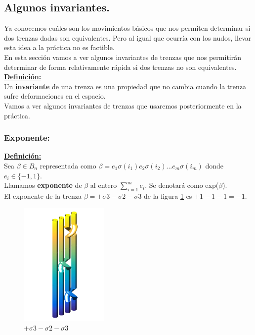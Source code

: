 \documentclass[14pt]{extarticle}
\begin{document}
\subsection{Algunos invariantes.}
Ya conocemos cuáles son los movimientos básicos que nos permiten determinar si dos trenzas dadas son equivalentes. Pero al igual que ocurría con los nudos, llevar esta idea a la práctica no es factible.\\

En esta sección vamos a ver algunos invariantes de trenzas que nos permitirán determinar de forma relativamente rápida si dos trenzas no son equivalentes.\\

\underline{\textbf{Definición:}} \\
Un \textbf{invariante} de una trenza es una propiedad que no cambia cuando la trenza sufre deformaciones en el espacio. \\

Vamos a ver algunos invariantes de trenzas que usaremos posteriormente en la práctica.

\bigskip
\subsubsection{Exponente:}\label{invtren1}
\textbf{\underline{Definición:}}\\
Sea $\beta \in B_{n}$ representada como $\beta = e_{1} \sigma(i_{1}) e_{2} \sigma(i_{2}) ... e_{m} \sigma(i_{m}) $ donde $e_{i} \in \{-1,1\}$.\\
Llamamos \textbf{exponente} de $\beta$ al entero $ \sum_{i=1}^{m} e_{i} $. Se denotará como exp($\beta$).\\

El exponente de la trenza $\beta = +\sigma3-\sigma2-\sigma3$ de la figura \ref{exp1} es $+1-1-1=-1$.\\
   \begin{figure}[h!]
   	\centering
   	\includegraphics[width=4.3cm]{itrenzas/4c3.png}
   	\caption{$+\sigma3-\sigma2-\sigma3$}
   	\label{exp1} 
   \end{figure}
\end{document}
